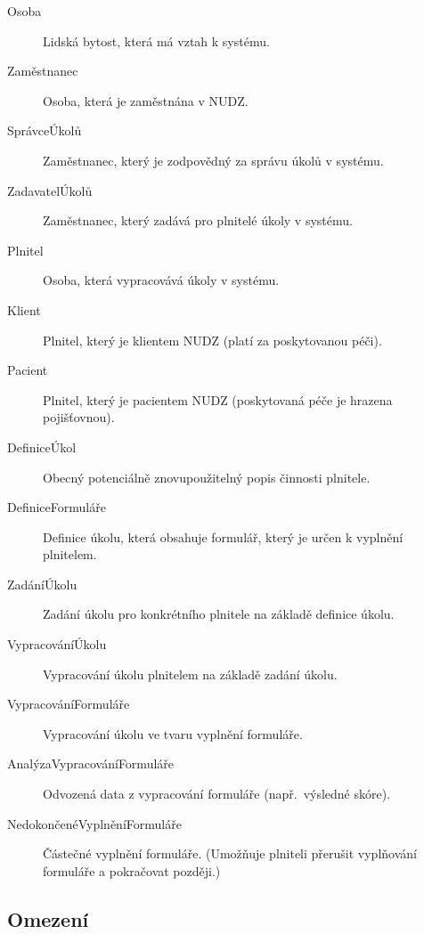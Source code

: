 \begin{description}
    \item[Osoba]
    Lidská bytost, která má vztah k systému.

    \item[Zaměstnanec]
    Osoba, která je zaměstnána v NUDZ\@.

    \item[SprávceÚkolů]
    Zaměstnanec, který je zodpovědný za správu úkolů v systému.

    \item[ZadavatelÚkolů]
    Zaměstnanec, který zadává pro plnitelé úkoly v systému.

    \item[Plnitel]
    Osoba, která vypracovává úkoly v systému.

    \item[Klient]
    Plnitel, který je klientem NUDZ (platí za poskytovanou péči).

    \item[Pacient]
    Plnitel, který je pacientem NUDZ (poskytovaná péče je hrazena pojišťovnou).

    \item[DefiniceÚkol]
    Obecný potenciálně znovupoužitelný popis činnosti plnitele.

    \item[DefiniceFormuláře]
    Definice úkolu, která obsahuje formulář, který je určen k vyplnění plnitelem.

    \item[ZadáníÚkolu]
    Zadání úkolu pro konkrétního plnitele na základě definice úkolu.

    \item[VypracováníÚkolu]
    Vypracování úkolu plnitelem na základě zadání úkolu.

    \item[VypracováníFormuláře]
    Vypracování úkolu ve tvaru vyplnění formuláře.

    \item[AnalýzaVypracováníFormuláře]
    Odvozená data z vypracování formuláře (např.\ výsledné skóre).

    \item[NedokončenéVyplněníFormuláře]
    Částečné vyplnění formuláře.
    (Umožňuje plniteli přerušit vyplňování formuláře a pokračovat později.)

\end{description}

\subsection{Omezení}\label{subsec:omezeni}

